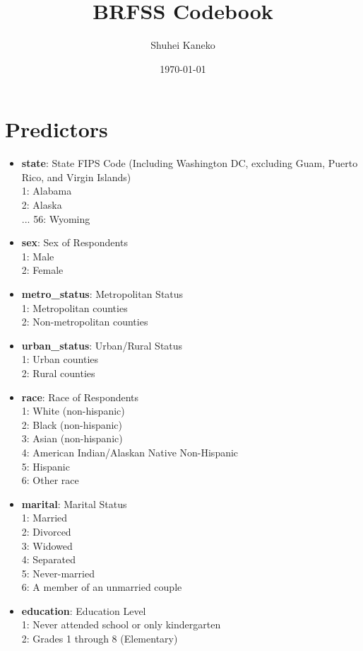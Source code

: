 \documentclass[11pt]{article}
\title{BRFSS Codebook}
\author{Shuhei Kaneko}
\date{\today}
\begin{document}
\maketitle

\section{Predictors}
\begin{itemize}
    \item \textbf{state}: State FIPS Code (Including Washington DC, excluding Guam, Puerto Rico, and Virgin Islands) \\
    1: Alabama \\
    2: Alaska \\ 
    ... 56: Wyoming 
    \item \textbf{sex}: Sex of Respondents \\
    1: Male \\
    2: Female 
    \item \textbf{metro\_status}: Metropolitan Status \\
    1: Metropolitan counties\\
    2: Non-metropolitan counties
    \item \textbf{urban\_status}: Urban/Rural Status \\
    1: Urban counties \\
    2: Rural counties
    \item \textbf{race}: Race of Respondents\\
    1: White (non-hispanic)\\
    2: Black (non-hispanic)\\
    3: Asian (non-hispanic)\\
    4: American Indian/Alaskan Native Non-Hispanic \\
    5: Hispanic\\
    6: Other race
    \item \textbf{marital}: Marital Status\\
    1: Married \\
    2: Divorced\\
    3: Widowed\\
    4: Separated\\
    5: Never-married\\
    6: A member of an unmarried couple 
    \item \textbf{education}: Education Level\\
    1: Never attended school or only kindergarten\\ 2: Grades 1 through 8 (Elementary)\\ 

\end{itemize}
\end{document}
